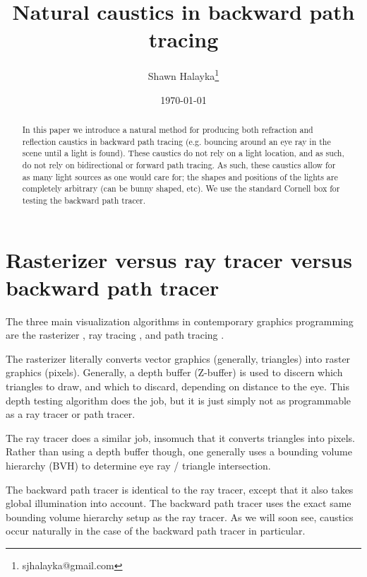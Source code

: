\documentclass[12pt]{article}
\title{Natural caustics in backward path tracing}
\author{
Shawn Halayka\footnote{sjhalayka@gmail.com}
}
\date{\today\;\currenttime}
\begin{document}
\newcommand{\abs}[1]{\lvert#1\rvert}



\maketitle




\begin{abstract}
In this paper we introduce a natural method for producing both refraction and reflection caustics in backward path tracing (e.g. bouncing around an eye ray in the scene until a light is found).
These caustics do not rely on a light location, and as such, do not rely on bidirectional or forward path tracing.
As such, these caustics allow for as many light sources as one would care for; the shapes and positions of the lights are completely arbitrary (can be bunny shaped, etc).
We use the standard Cornell box for testing the backward path tracer.
\end{abstract}







\section{Rasterizer versus ray tracer versus backward path tracer}

The three main visualization algorithms in contemporary graphics programming are the rasterizer \cite{noll, wikipedia1}, ray tracing \cite{appel, wikipedia2}, and path tracing \cite{kajiya, wikipedia3}.

The rasterizer  literally converts vector graphics (generally, triangles) into raster graphics (pixels).
Generally, a depth buffer (Z-buffer) \cite{wikipedia4} is used to discern which triangles to draw, and which to discard, depending on distance to the eye.
This depth testing algorithm does the job, but it is just simply not as programmable as a ray tracer or path tracer.

The ray tracer does a similar job, insomuch that it converts triangles into pixels.
Rather than using a depth buffer though, one generally uses a bounding volume hierarchy (BVH) \cite{wikipedia5} to determine eye ray / triangle intersection.

The backward path tracer  is identical to the ray tracer, except that it also takes global illumination into account.
The backward path tracer uses the exact same bounding volume hierarchy setup as the ray tracer.
As we will soon see, caustics occur naturally in the case of the backward path tracer in particular.
\end{document}
